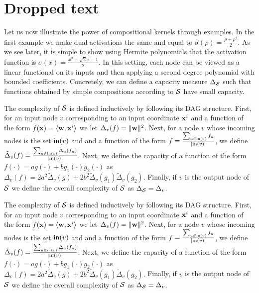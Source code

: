 \section{Dropped text}
Let us now illustrate the power of compositional kernels through examples.
In the first example we make dual activations the same and equal to
$\hat\sigma(\rho)=\frac{\rho+\rho^2}{2}$. As we see later, it is simple to
show using Hermite polynomials that the activation function is
$\sigma(x)=\frac{x^2+\sqrt{2}x-1}{2}$. In this setting, each node can be
viewed as a linear functional on its inputs and then applying a second degree
polynomial with bounded coefficients. Concretely,
we can define a capacity measure $\Delta_{\cal S}$ such that functions obtained by
simple compositions according to ${\cal S}$ have small capacity.

The complexity of ${\cal S}$ is defined inductively by following its DAG structure.
First, for an input node $v$ corresponding to an input coordinate ${\mathbf x}^i$ and a
function of the form $f({\mathbf x})=\langle {\mathbf w},{\mathbf x}^i \rangle$ we let $\Delta_v(f)=\|{\mathbf w}\|^2$.
Next, for a node $v$ whose incoming nodes is the set $\mathrm{in}(v)$ and and a
function of the form $f=\frac{\sum_{u\in\mathrm{in}(v)} f_u}{|\mathrm{in}(v)|}$, we define
$\tilde{\Delta}_{v}(f)=\frac{\sum_{u\in\mathrm{in}(v)} \Delta_{u}(f_u)}{|\mathrm{in}(v)|}$.
Next, we define the capacity of a function of the form
$f(\cdot)=ag(\cdot)+bg_1(\cdot)g_2(\cdot)$ as
$\Delta_v(f) =
2a^2\tilde{\Delta}_{v}(g) +
2b^2\tilde{\Delta}_{v}(g_1) \tilde{\Delta}_{v}(g_2).$
Finally, if $v$ is the output node of ${\cal S}$ we define the overall complexity
of ${\cal S}$ as $\Delta_{\cal S}=\Delta_v$.

The complexity of ${\cal S}$ is defined inductively by following its DAG structure.
First, for an input node $v$ corresponding to an input coordinate ${\mathbf x}^i$ and a
function of the form $f({\mathbf x})=\langle {\mathbf w},{\mathbf x}^i \rangle$ we let $\Delta_v(f)=\|{\mathbf w}\|^2$.
Next, for a node $v$ whose incoming nodes is the set $\mathrm{in}(v)$ and and a
function of the form $f=\frac{\sum_{u\in\mathrm{in}(v)} f_u}{|\mathrm{in}(v)|}$, we define
$\tilde{\Delta}_{v}(f)=\frac{\sum_{u\in\mathrm{in}(v)} \Delta_{u}(f_u)}{|\mathrm{in}(v)|}$.
Next, we define the capacity of a function of the form
$f(\cdot)=ag(\cdot)+bg_1(\cdot)g_2(\cdot)$ as
$\Delta_v(f) =
2a^2\tilde{\Delta}_{v}(g) +
2b^2\tilde{\Delta}_{v}(g_1) \tilde{\Delta}_{v}(g_2).$
Finally, if $v$ is the output node of ${\cal S}$ we define the overall complexity
of ${\cal S}$ as $\Delta_{\cal S}=\Delta_v$.

